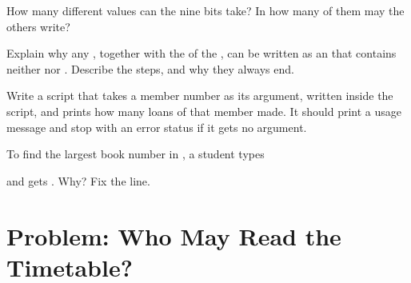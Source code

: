 \begin{exercise}[$\star\star\star$]\label{exo:g11:os-and-command-line:12}
How many different values can the nine  bits take? In how many of them may the others write?
\end{exercise}

\begin{exercise}[$\star\star\star$]\label{exo:g11:os-and-command-line:13}
Explain why any , together with the  of the , can be written as an
 that contains neither  nor . Describe the steps, and why they always end.
\end{exercise}

\begin{exercise}[$\star\star\star$]\label{exo:g11:os-and-command-line:14}
Write a  script  that takes a member number as its argument, written  inside the
script, and prints how many loans of  that member made. It should print a usage message and stop
with an error status if it gets no argument.
\end{exercise}

\begin{exercise}[$\star\star\star$]\label{exo:g11:os-and-command-line:15}
To find the largest book number in , a student types

\smallskip\noindent\hspace*{2em}

\smallskip\noindent and gets . Why? Fix the  line.
\end{exercise}

\section{Problem: Who May Read the Timetable?}\label{sec:g11:os-and-command-line:problem}

